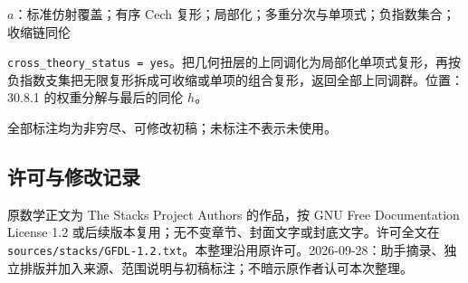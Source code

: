 \documentclass[UTF8,11pt]{ctexart}
\theoremstyle{definition}
\begin{document}
$a$：标准仿射覆盖；有序 Cech 复形；局部化；多重分次与单项式；负指数集合；收缩链同伦

\texttt{cross\_theory\_status = yes}。把几何扭层的上同调化为局部化单项式复形，再按负指数支集把无限复形拆成可收缩或单项的组合复形，返回全部上同调群。位置：30.8.1 的权重分解与最后的同伦 $h$。

全部标注均为非穷尽、可修改初稿；未标注不表示未使用。
\subsection*{许可与修改记录}
原数学正文为 The Stacks Project Authors 的作品，按 GNU Free Documentation License 1.2 或后续版本复用；无不变章节、封面文字或封底文字。许可全文在 \texttt{sources/stacks/GFDL-1.2.txt}。本整理沿用原许可。2026-09-28：助手摘录、独立排版并加入来源、范围说明与初稿标注；不暗示原作者认可本次整理。
\end{document}
